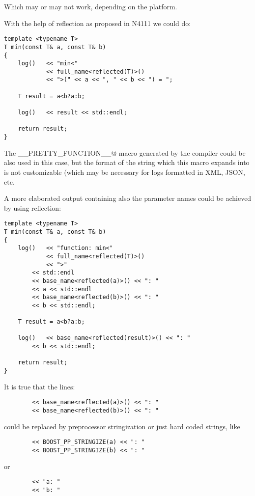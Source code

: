 Which may or may not work, depending on the platform.

With the help of reflection as proposed in N4111 we could do:

\begin{verbatim}
template <typename T>
T min(const T& a, const T& b)
{
	log()   << "min<"
	        << full_name<reflected(T)>()
	        << ">(" << a << ", " << b << ") = ";

	T result = a<b?a:b;

	log()   << result << std::endl;

	return result;
}
\end{verbatim}

The \verb@__PRETTY_FUNCTION__@ macro generated by the compiler could be also
used in this case, but the format of the string which this macro expands into is not customizable
(which may be necessary for logs formatted in XML, JSON, etc.

A more elaborated output containing also the parameter names could be achieved
by using reflection:

\begin{verbatim}
template <typename T>
T min(const T& a, const T& b)
{
	log()   << "function: min<"
	        << full_name<reflected(T)>()
	        << ">"
		<< std::endl
		<< base_name<reflected(a)>() << ": "
		<< a << std::endl
		<< base_name<reflected(b)>() << ": "
		<< b << std::endl;

	T result = a<b?a:b;

	log()   << base_name<reflected(result)>() << ": "
		<< b << std::endl;

	return result;
}
\end{verbatim}

It is true that the lines:
\begin{verbatim}
		<< base_name<reflected(a)>() << ": "
		<< base_name<reflected(b)>() << ": "
\end{verbatim}

could be replaced by preprocessor stringization or just hard coded
strings, like

\begin{verbatim}
		<< BOOST_PP_STRINGIZE(a) << ": "
		<< BOOST_PP_STRINGIZE(b) << ": "
\end{verbatim}

or

\begin{verbatim}
		<< "a: "
		<< "b: "
\end{verbatim}

